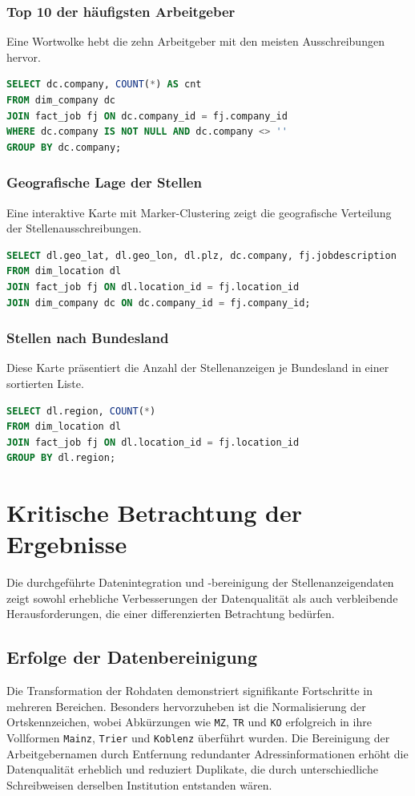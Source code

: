 \documentclass[
    a4paper,
    12pt,
    headinclude=true,
    BCOR=10mm,
]{scrreprt}
\begin{document}
\subsection{Top 10 der häufigsten Arbeitgeber}
Eine Wortwolke hebt die zehn Arbeitgeber mit den meisten Ausschreibungen hervor.
\begin{lstlisting}[language=SQL]
SELECT dc.company, COUNT(*) AS cnt
FROM dim_company dc
JOIN fact_job fj ON dc.company_id = fj.company_id
WHERE dc.company IS NOT NULL AND dc.company <> ''
GROUP BY dc.company;
\end{lstlisting}

\subsection{Geografische Lage der Stellen}
Eine interaktive Karte mit Marker-Clustering zeigt die geografische Verteilung der Stellenausschreibungen.
\begin{lstlisting}[language=SQL]
SELECT dl.geo_lat, dl.geo_lon, dl.plz, dc.company, fj.jobdescription
FROM dim_location dl
JOIN fact_job fj ON dl.location_id = fj.location_id
JOIN dim_company dc ON dc.company_id = fj.company_id;
\end{lstlisting}

\subsection{Stellen nach Bundesland}
Diese Karte präsentiert die Anzahl der Stellenanzeigen je Bundesland in einer sortierten Liste.
\begin{lstlisting}[language=SQL]
SELECT dl.region, COUNT(*)
FROM dim_location dl
JOIN fact_job fj ON dl.location_id = fj.location_id
GROUP BY dl.region;
\end{lstlisting}

\chapter{Kritische Betrachtung der Ergebnisse}
Die durchgeführte Datenintegration und -bereinigung der Stellenanzeigendaten zeigt sowohl erhebliche Verbesserungen der Datenqualität als auch verbleibende Herausforderungen, die einer differenzierten Betrachtung bedürfen.

\section{Erfolge der Datenbereinigung}
Die Transformation der Rohdaten demonstriert signifikante Fortschritte in mehreren Bereichen. Besonders hervorzuheben ist die Normalisierung der Ortskennzeichen, wobei Abkürzungen wie \texttt{MZ}, \texttt{TR} und \texttt{KO} erfolgreich in ihre Vollformen \texttt{Mainz}, \texttt{Trier} und \texttt{Koblenz} überführt wurden. 
Die Bereinigung der Arbeitgebernamen durch Entfernung redundanter Adressinformationen erhöht die Datenqualität erheblich und reduziert Duplikate, die durch unterschiedliche Schreibweisen derselben Institution entstanden wären.
\end{document}

